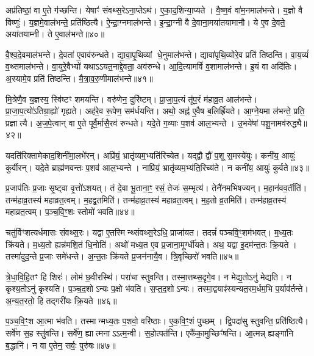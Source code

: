 अप्र॑तिष्ठां॒ वा ए॒ते ग॑च्छन्ति।
येषाꣳ॑ संवथ्स॒रे\-ऽना॒प्तेऽथ॑।
ए॒का॒द॒शिन्या॒प्यते।
वै॒ष्ण॒वं वा॑म॒नमाल॑भन्ते।
य॒ज्ञो वै विष्णुः॑।
य॒ज्ञमे॒वाल॑भन्ते॒ प्रति॑ष्ठित्यै।
ऐ॒न्द्रा॒ग्नमाल॑भन्ते।
इ॒न्द्रा॒ग्नी वै दे॒वाना॒मया॑तयामानौ।
ये ए॒व दे॒वते॒ अया॑तयाम्नी।
ते ए॒वाल॑भन्ते॥४०॥

वै॒श्व॒दे॒वमाल॑भन्ते।
दे॒वता॑ ए॒वाव॑रुन्धते।
द्या॒वा॒पृ॒थिव्यां धे॒नुमाल॑भन्ते।
द्यावा॑पृथि॒व्योरे॒व प्रति॑ तिष्ठन्ति।
वा॒य॒व्यं॑ व॒थ्समाल॑भन्ते।
वा॒युरे॒वैभ्यो॑ यथा\-ऽऽयत॒नाद्दे॒वता॒ अव॑रुन्धे।
आ॒दि॒त्यामविं॑ व॒शामाल॑भन्ते।
इ॒यं वा अदि॑तिः।
अ॒स्यामे॒व प्रति॑ तिष्ठन्ति।
मै॒त्रा॒व॒रु॒णीमाल॑भन्ते॥४१॥

मि॒त्रेणै॒व य॒ज्ञस्य॒ स्वि॑ष्टꣳ शमयन्ति।
वरु॑णेन॒ दुरि॑ष्टम्।
प्रा॒जा॒प॒त्यं तू॑प॒रं म॑हाव्र॒त आल॑भन्ते।
प्रा॒जा॒प॒त्यो॑\-ऽतिग्रा॒ह्यो॑ गृह्यते।
अह॑रे॒व रू॒पेण॒ सम॑र्धयन्ति।
अथो॒ अह्न॑ ए॒वैष ब॒लिर्\mbox{}ह्रि॑यते।
आ॒ग्ने॒यमा ल॑भन्ते॒ प्रति॒ प्रज्ञात्यै।
अ॒ज॒पे॒त्वान् वा ए॒ते पूर्वै॒र्मासै॒रव॑ रुन्धते।
यदे॒ते ग॒व्याः प॒शव॑ आल॒भ्यन्ते।
उ॒भये॑षां पशू॒नामव॑रुद्ध्यै॥४२॥

यदति॑रिक्तामेकाद॒शिनी॑मा॒लभे॑रन्।
अप्रि॑यं॒ भ्रातृ॑व्यम॒भ्यति॑\-रिच्येत।
यद्द्वौ द्वौ॑ प॒शू स॒मस्ये॑युः।
कनी॑य॒ आयुः॑ कुर्वीरन्।
यदे॒ते ब्राह्म॑णवन्तः प॒शव॑ आल॒भ्यन्ते।
नाप्रि॑यं॒ भ्रातृ॑व्यम॒भ्य॑ति॒रिच्य॑ते।
न कनी॑य॒ आयुः॑ कुर्वते॥४३॥\anuvakamend[ते ए॒वाल॑भन्ते मैत्रावरु॒णीमाल॑भ॒न्ते\-ऽव॑रुद्ध्यै स॒प्त च॑]

प्र॒जाप॑तिः प्र॒जाः सृ॒ष्ट्वा वृ॒त्तो॑\-ऽशयत्।
तं दे॒वा भू॒ताना॒ꣳ॒ रसं॒ तेजः॑ स॒म्भृत्य॑।
तेनै॑नमभिषज्यन्।
म॒हान॑वव॒र्तीति॑।
तन्म॑हाव्र॒तस्य॑ महाव्रत॒त्वम्।
म॒हद्व्र॒तमिति॑।
तन्म॑हाव्र॒तस्य॑ महाव्रत॒त्वम्।
म॒ह॒तो व्र॒तमिति॑।
तन्म॑हाव्र॒तस्य॑ महाव्रत॒त्वम्।
प॒ञ्च॒वि॒ꣳ॒शः स्तोमो॑ भवति॥४४॥

चतु॑र्विꣳशत्यर्धमासः संवथ्स॒रः।
यद्वा ए॒तस्मिन्थ्संवथ्स॒रेऽधि॒ प्राजा॑यत।
तदन्नं॑ पञ्चवि॒ꣳ॒शम॑भवत्।
म॒ध्य॒तः क्रि॑यते।
म॒ध्य॒तो ह्यन्न॑मशि॒तं धि॒नोति॑।
अथो॑ मध्य॒त ए॒व प्र॒जाना॒मूर्ग्धी॑यते।
अथ॒ यद्वा इ॒दम॑न्त॒तः क्रि॒यते।
तस्मा॑दुद॒न्ते प्र॒जाः समे॑धन्ते।
अ॒न्त॒तः क्रि॑यते प्र॒जन॑नायै॒व।
त्रि॒वृच्छिरो॑ भवति॥४५॥

त्रे॒धा॒वि॒हि॒तꣳ हि शिरः॑।
लोम॑ छ॒वीरस्थि॑।
परा॑चा स्तुवन्ति।
तस्मा॒त्तथ्स॒दृगे॒व।
न मेद्य॒तोऽनु॑ मेद्यति।
न कृश्य॒तोऽनु॑ कृश्यति।
प॒ञ्च॒द॒शो\-ऽन्यः प॒क्षो भ॑वति।
स॒प्त॒द॒शो\-ऽन्यः।
तस्मा॒द्वयाꣴ॑स्यन्यत॒रम॒र्धम॒भि प॒र्याव॑र्तन्ते।
अ॒न्य॒त॒रतो॒ हि तद्गरी॑यः क्रि॒यते॥४६॥

प॒ञ्च॒वि॒ꣳ॒श आ॒त्मा भ॑वति।
तस्मान्मध्य॒तः प॒शवो॒ वरि॑ष्ठाः।
ए॒क॒वि॒ꣳ॒शं पुच्छम्।
द्वि॒पदा॑सु स्तुवन्ति॒ प्रति॑ष्ठित्यै।
सर्वे॑ण स॒ह स्तु॑वन्ति।
सर्वे॑ण॒ ह्यात्मना\-ऽऽत्म॒न्वी।
स॒होत्पत॑न्ति।
एकै॑का॒मुच्छिꣳ॑षन्ति।
आ॒त्मन्न् ह्यङ्गा॑नि ब॒द्धानि॑।
न वा ए॒तेन॒ सर्वः॒ पुरु॑षः॥४७॥

